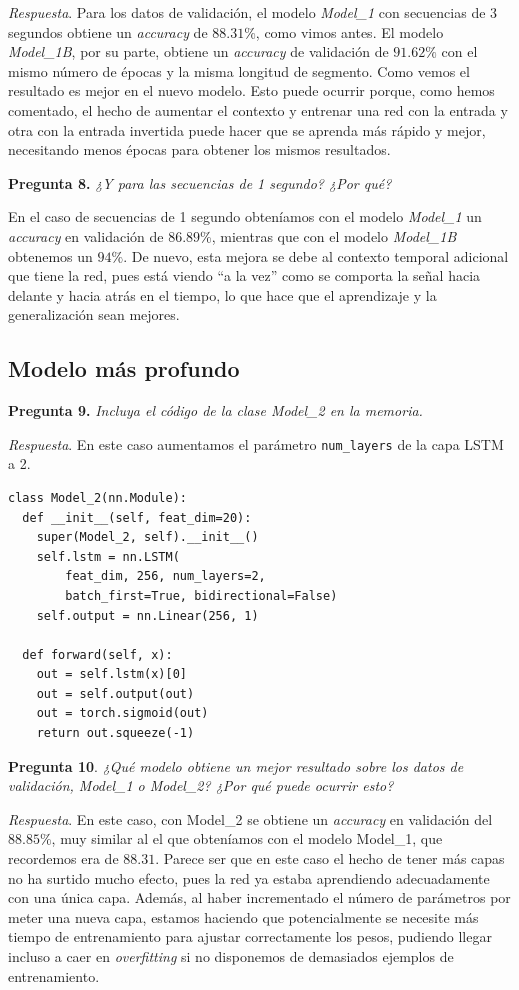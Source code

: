 \documentclass[11pt]{article}
\begin{document}
\textit{Respuesta}. Para los datos de validación, el modelo \textit{Model\_1} con secuencias de 3 segundos obtiene un \textit{accuracy} de $88.31\%$, como vimos antes. El modelo \textit{Model\_1B}, por su parte, obtiene un \textit{accuracy} de validación de $91.62\%$ con el mismo número de épocas y la misma longitud de segmento. Como vemos el resultado es mejor en el nuevo modelo. Esto puede ocurrir porque, como hemos comentado, el hecho de aumentar el contexto y entrenar una red con la entrada y otra con la entrada invertida puede hacer que se aprenda más rápido y mejor, necesitando menos épocas para obtener los mismos resultados.

\textbf{Pregunta 8.} \textit{¿Y para las secuencias de 1 segundo? ¿Por qué?}

En el caso de secuencias de 1 segundo obteníamos con el modelo \textit{Model\_1} un \textit{accuracy} en validación de $86.89\%$, mientras que con el modelo \textit{Model\_1B} obtenemos un $94\%$. De nuevo, esta mejora se debe al contexto temporal adicional que tiene la red, pues está viendo ``a la vez'' como se comporta la señal hacia delante y hacia atrás en el tiempo, lo que hace que el aprendizaje y la generalización sean mejores.

\subsection{Modelo más profundo}

\textbf{Pregunta 9.} \textit{Incluya el código de la clase Model\_2 en la memoria.}

\textit{Respuesta}. En este caso aumentamos el parámetro \texttt{num\_layers} de la capa LSTM a 2.

\begin{verbatim}
class Model_2(nn.Module):
  def __init__(self, feat_dim=20):
    super(Model_2, self).__init__()
    self.lstm = nn.LSTM(
        feat_dim, 256, num_layers=2,
        batch_first=True, bidirectional=False)
    self.output = nn.Linear(256, 1)

  def forward(self, x):
    out = self.lstm(x)[0]
    out = self.output(out)
    out = torch.sigmoid(out)
    return out.squeeze(-1)
\end{verbatim}

\textbf{Pregunta 10}. \textit{¿Qué modelo obtiene un mejor resultado sobre los datos de validación, Model\_1 o Model\_2? ¿Por qué puede ocurrir esto?}

\textit{Respuesta}. En este caso, con Model\_2 se obtiene un \textit{accuracy} en validación del $88.85\%$, muy similar al el que obteníamos con el modelo Model\_1, que recordemos era de $88.31$. Parece ser que en este caso el hecho de tener más capas no ha surtido mucho efecto, pues la red ya estaba aprendiendo adecuadamente con una única capa. Además, al haber incrementado el número de parámetros por meter una nueva capa, estamos haciendo que potencialmente se necesite más tiempo de entrenamiento para ajustar correctamente los pesos, pudiendo llegar incluso a caer en \textit{overfitting} si no disponemos de demasiados ejemplos de entrenamiento.
\end{document}
